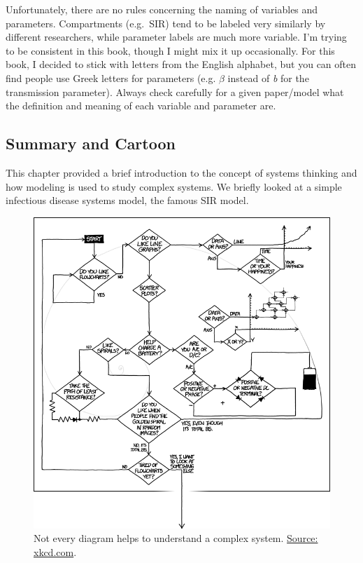 \documentclass[]{article}
\theoremstyle{definition}
\theoremstyle{definition}
\theoremstyle{definition}
\theoremstyle{remark}
\begin{document}
Unfortunately, there are no rules concerning the naming of variables and
parameters. Compartments (e.g.~SIR) tend to be labeled very similarly by
different researchers, while parameter labels are much more variable.
I'm trying to be consistent in this book, though I might mix it up
occasionally. For this book, I decided to stick with letters from the
English alphabet, but you can often find people use Greek letters for
parameters (e.g. \(\beta\) instead of \emph{b} for the transmission
parameter). Always check carefully for a given paper/model what the
definition and meaning of each variable and parameter are.

\subsection{Summary and Cartoon}\label{summary-and-cartoon}

This chapter provided a brief introduction to the concept of systems
thinking and how modeling is used to study complex systems. We briefly
looked at a simple infectious disease systems model, the famous SIR
model.

\begin{figure}
\centering
\includegraphics{./images/xkcd-flowcharts.png}
\caption{\label{fig:complexcartoon}Not every diagram helps to understand a
complex system. \href{https://xkcd.com/1488/}{Source: xkcd.com}.}
\end{figure}
\end{document}
